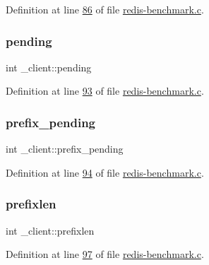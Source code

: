 Definition at line \hyperlink{redis-benchmark_8c_source_l00086}{86} of file \hyperlink{redis-benchmark_8c_source}{redis-\/benchmark.\+c}.

\mbox{\label{struct__client_a5eac5d96479e9f8ab90b354091ba52b2}} 
\subsubsection{\texorpdfstring{pending}{pending}}
{\footnotesize\ttfamily int \+\_\+client\+::pending}



Definition at line \hyperlink{redis-benchmark_8c_source_l00093}{93} of file \hyperlink{redis-benchmark_8c_source}{redis-\/benchmark.\+c}.

\mbox{\label{struct__client_aad427d69d85dfc467667d98db731fbf6}} 
\subsubsection{\texorpdfstring{prefix\+\_\+pending}{prefix\_pending}}
{\footnotesize\ttfamily int \+\_\+client\+::prefix\+\_\+pending}



Definition at line \hyperlink{redis-benchmark_8c_source_l00094}{94} of file \hyperlink{redis-benchmark_8c_source}{redis-\/benchmark.\+c}.

\mbox{\label{struct__client_aa41fe19a482f33556cd423d41edff795}} 
\subsubsection{\texorpdfstring{prefixlen}{prefixlen}}
{\footnotesize\ttfamily int \+\_\+client\+::prefixlen}



Definition at line \hyperlink{redis-benchmark_8c_source_l00097}{97} of file \hyperlink{redis-benchmark_8c_source}{redis-\/benchmark.\+c}.

\mbox{\label{struct__client_a17e1e70f120c1b211d0f374617a9e269}} 
